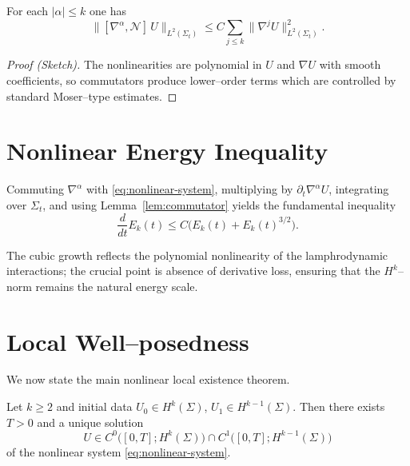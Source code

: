 \begin{lemma}
\label{lem:commutator}
For each $|\alpha|\le k$ one has
\[
\bigl\|\![\nabla^{\alpha},\mathcal{N}]\,U\bigr\|_{L^{2}(\Sigma_{t})}
\le
C\sum_{j\le k}\|\nabla^{j}U\|_{L^{2}(\Sigma_{t})}^{2}.
\]
\end{lemma}

\begin{proof}[Proof (Sketch)]
The nonlinearities are polynomial in $U$ and $\nabla U$ with smooth
coefficients, so commutators produce lower--order terms which are
controlled by standard Moser--type estimates.
\end{proof}



\section{Nonlinear Energy Inequality}
\label{sec:nonlinear-energy}

Commuting $\nabla^{\alpha}$ with \eqref{eq:nonlinear-system}, multiplying
by $\partial_{t}\nabla^{\alpha}U$, integrating over $\Sigma_{t}$, and
using Lemma~\ref{lem:commutator} yields the fundamental inequality
\begin{equation}
\label{eq:nonlinear-energy-ineq}
\frac{d}{dt}E_{k}(t)
\le
C\bigl(E_{k}(t) + E_{k}(t)^{3/2}\bigr).
\end{equation}

\begin{remark}
The cubic growth reflects the polynomial nonlinearity of the
lamphrodynamic interactions; the crucial point is absence of derivative
loss, ensuring that the $H^{k}$--norm remains the natural energy scale.
\end{remark}



\section{Local Well--posedness}
\label{sec:local-wp}

We now state the main nonlinear local existence theorem.

\begin{theorem}
\label{thm:local-wp}
Let $k\ge2$ and initial data
$U_{0}\in H^{k}(\Sigma)$,
$U_{1}\in H^{k-1}(\Sigma)$.
Then there exists $T>0$ and a unique solution
\[
U\in C^{0}\bigl([0,T];H^{k}(\Sigma)\bigr)
\cap C^{1}\bigl([0,T];H^{k-1}(\Sigma)\bigr)
\]
of the nonlinear system \eqref{eq:nonlinear-system}.
\end{theorem}

